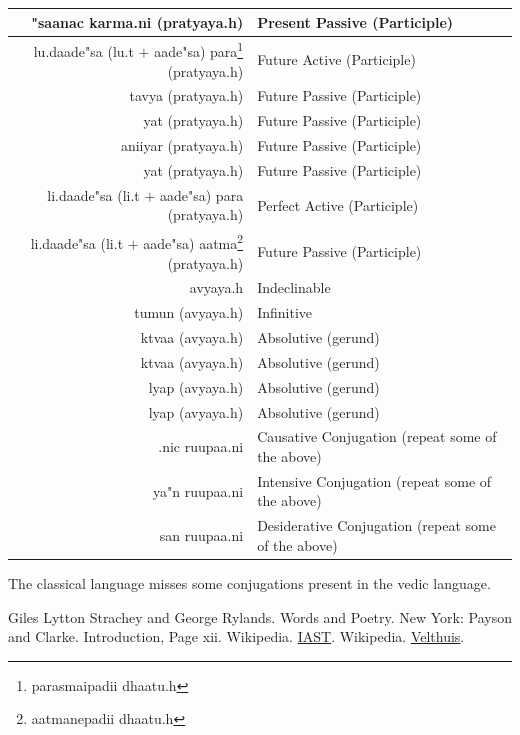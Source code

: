 \documentclass[a4paper, 12pt]{article}
\newcommand \sans[1]{
    \textsanskrit{#1}
}
\begin{document}
\begin{table}[h!]
\begin{center}
\begin{longtable}{|r|l|}
    \hline
    \sans{"saanac karma.ni (pratyaya.h)} &
    Present Passive (Participle)\\
    \hline
    \sans{lu.daade"sa (lu.t $+$ aade"sa) para\footnote{\sans{parasmaipadii dhaatu.h}} (pratyaya.h)} &
    Future Active (Participle)\\
    \hline
    \sans{tavya (pratyaya.h)} &
    Future Passive (Participle)\\
    \hline
    \sans{yat (pratyaya.h)} &
    Future Passive (Participle)\\
    \hline
    \sans{aniiyar (pratyaya.h)} &
    Future Passive (Participle)\\
    \hline
    \sans{yat (pratyaya.h)} &
    Future Passive (Participle)\\
    \hline
    \sans{li.daade"sa (li.t $+$ aade"sa) para (pratyaya.h)} &
    Perfect Active (Participle)\\
    \hline
    \sans{li.daade"sa (li.t $+$ aade"sa) aatma\footnote{\sans{aatmanepadii dhaatu.h}} (pratyaya.h)} &
    Future Passive (Participle)\\
    \hline
    \sans{avyaya.h}&
    Indeclinable\\
    \hline
    \sans{tumun (avyaya.h)} &
    Infinitive\\
    \hline
    \sans{ktvaa (avyaya.h)} &
    Absolutive (gerund)\\
    \hline
    \sans{ktvaa (avyaya.h)} &
    Absolutive (gerund)\\
    \hline
    \sans{lyap (avyaya.h)} &
    Absolutive (gerund)\\
    \hline
    \sans{lyap (avyaya.h)} &
    Absolutive (gerund)\\
    \hline
    \sans{.nic ruupaa.ni} &
    Causative Conjugation (repeat some of the above)\\
    \hline
    \sans{ya"n ruupaa.ni} &
    Intensive Conjugation (repeat some of the above)\\
    \hline
    \sans{san ruupaa.ni} &
    Desiderative Conjugation (repeat some of the above)\\
    \hline
\end{longtable}
\end{center}
\end{table}

The classical language misses some conjugations present in the vedic language.


\begin{thebibliography}{00}
     Giles Lytton Strachey and George Rylands. Words and Poetry. New York: Payson and Clarke. Introduction, Page xii.
     Wikipedia. \href{https://en.wikipedia.org/wiki/International_Alphabet_of_Sanskrit_Transliteration}{IAST}.
     Wikipedia. \href{https://en.wikipedia.org/wiki/Velthuis}{Velthuis}.
\end{thebibliography}
\end{document}
